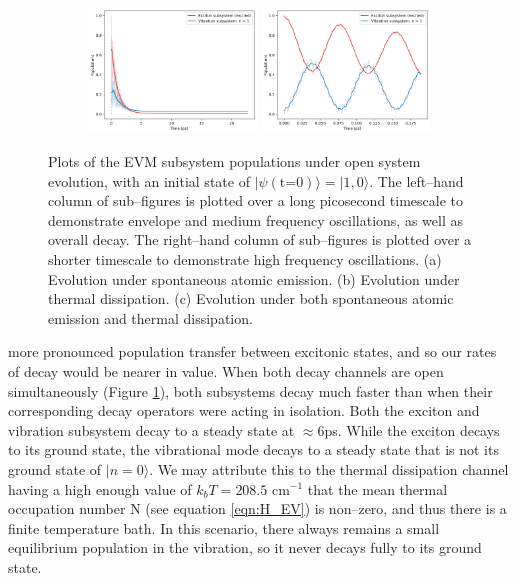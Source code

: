 \documentclass[11pt]{article}
\begin{document}
\begin{figure}[H]
    \vspace{0.8em}

    \begin{subfigure}{\textwidth}
        \centering
        \includegraphics[width=0.49\textwidth]{Research Project/Code/results/ExVib/Open/Population/Envelope/pops_ex_both_e0.png}
        \hfill
        \includegraphics[width=0.49\textwidth]{Research Project/Code/results/ExVib/Open/Population/Fast/pops_ex_both_e0.png}
        \caption{}
        \label{fig:EVM_OQS_Pop_both_e0}
    \end{subfigure}
    \caption{Plots of the EVM subsystem populations under open system evolution, with an initial state of $|\psi (\text{t=0})\rangle = |1, 0\rangle$. The left--hand column of sub--figures is plotted over a long picosecond timescale to demonstrate envelope and medium frequency oscillations, as well as overall decay. The right--hand column of sub--figures is plotted over a shorter timescale to demonstrate high frequency oscillations. (a) Evolution under spontaneous atomic emission. (b) Evolution under thermal dissipation. (c) Evolution under both spontaneous atomic emission and thermal dissipation.}
    \label{fig:EVM_OQS_Pop_e0}
\end{figure}
\vspace{-0.1cm}
\noindent more pronounced population transfer between excitonic states, and so our rates of decay would be nearer in value.
When both decay channels are open simultaneously (Figure \ref{fig:EVM_OQS_Pop_both_e0}), both subsystems decay much faster than when their corresponding decay operators were acting in isolation. Both the exciton and vibration subsystem decay to a steady state at $\approx 6$ps. While the exciton decays to its ground state, the vibrational mode decays to a steady state that is not its ground state of $|n=0\rangle$. We may attribute this to the thermal dissipation channel having a high enough value of $k_bT = 208.5\text{ cm}^{-1}$ that the mean thermal occupation number N (see equation \eqref{eqn:H_EV}) is non--zero, and thus there is a finite temperature bath. In this scenario, there always remains a small equilibrium population in the vibration, so it never decays fully to its ground state.\\
\end{document}
